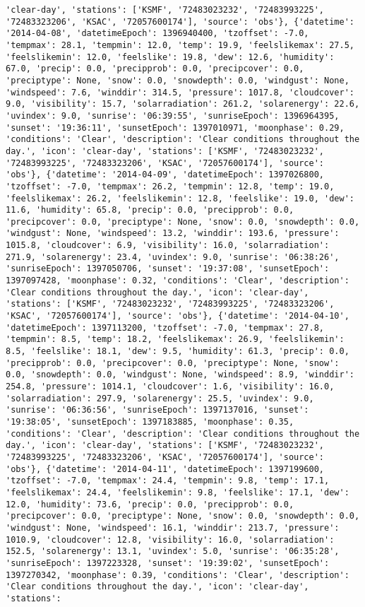 \documentclass[
  letterpaper,
  DIV=11,
  numbers=noendperiod]{scrartcl}
\begin{document}
\begin{verbatim}
'clear-day', 'stations': ['KSMF', '72483023232', '72483993225', '72483323206', 'KSAC', '72057600174'], 'source': 'obs'}, {'datetime': '2014-04-08', 'datetimeEpoch': 1396940400, 'tzoffset': -7.0, 'tempmax': 28.1, 'tempmin': 12.0, 'temp': 19.9, 'feelslikemax': 27.5, 'feelslikemin': 12.0, 'feelslike': 19.8, 'dew': 12.6, 'humidity': 67.0, 'precip': 0.0, 'precipprob': 0.0, 'precipcover': 0.0, 'preciptype': None, 'snow': 0.0, 'snowdepth': 0.0, 'windgust': None, 'windspeed': 7.6, 'winddir': 314.5, 'pressure': 1017.8, 'cloudcover': 9.0, 'visibility': 15.7, 'solarradiation': 261.2, 'solarenergy': 22.6, 'uvindex': 9.0, 'sunrise': '06:39:55', 'sunriseEpoch': 1396964395, 'sunset': '19:36:11', 'sunsetEpoch': 1397010971, 'moonphase': 0.29, 'conditions': 'Clear', 'description': 'Clear conditions throughout the day.', 'icon': 'clear-day', 'stations': ['KSMF', '72483023232', '72483993225', '72483323206', 'KSAC', '72057600174'], 'source': 'obs'}, {'datetime': '2014-04-09', 'datetimeEpoch': 1397026800, 'tzoffset': -7.0, 'tempmax': 26.2, 'tempmin': 12.8, 'temp': 19.0, 'feelslikemax': 26.2, 'feelslikemin': 12.8, 'feelslike': 19.0, 'dew': 11.6, 'humidity': 65.8, 'precip': 0.0, 'precipprob': 0.0, 'precipcover': 0.0, 'preciptype': None, 'snow': 0.0, 'snowdepth': 0.0, 'windgust': None, 'windspeed': 13.2, 'winddir': 193.6, 'pressure': 1015.8, 'cloudcover': 6.9, 'visibility': 16.0, 'solarradiation': 271.9, 'solarenergy': 23.4, 'uvindex': 9.0, 'sunrise': '06:38:26', 'sunriseEpoch': 1397050706, 'sunset': '19:37:08', 'sunsetEpoch': 1397097428, 'moonphase': 0.32, 'conditions': 'Clear', 'description': 'Clear conditions throughout the day.', 'icon': 'clear-day', 'stations': ['KSMF', '72483023232', '72483993225', '72483323206', 'KSAC', '72057600174'], 'source': 'obs'}, {'datetime': '2014-04-10', 'datetimeEpoch': 1397113200, 'tzoffset': -7.0, 'tempmax': 27.8, 'tempmin': 8.5, 'temp': 18.2, 'feelslikemax': 26.9, 'feelslikemin': 8.5, 'feelslike': 18.1, 'dew': 9.5, 'humidity': 61.3, 'precip': 0.0, 'precipprob': 0.0, 'precipcover': 0.0, 'preciptype': None, 'snow': 0.0, 'snowdepth': 0.0, 'windgust': None, 'windspeed': 8.9, 'winddir': 254.8, 'pressure': 1014.1, 'cloudcover': 1.6, 'visibility': 16.0, 'solarradiation': 297.9, 'solarenergy': 25.5, 'uvindex': 9.0, 'sunrise': '06:36:56', 'sunriseEpoch': 1397137016, 'sunset': '19:38:05', 'sunsetEpoch': 1397183885, 'moonphase': 0.35, 'conditions': 'Clear', 'description': 'Clear conditions throughout the day.', 'icon': 'clear-day', 'stations': ['KSMF', '72483023232', '72483993225', '72483323206', 'KSAC', '72057600174'], 'source': 'obs'}, {'datetime': '2014-04-11', 'datetimeEpoch': 1397199600, 'tzoffset': -7.0, 'tempmax': 24.4, 'tempmin': 9.8, 'temp': 17.1, 'feelslikemax': 24.4, 'feelslikemin': 9.8, 'feelslike': 17.1, 'dew': 12.0, 'humidity': 73.6, 'precip': 0.0, 'precipprob': 0.0, 'precipcover': 0.0, 'preciptype': None, 'snow': 0.0, 'snowdepth': 0.0, 'windgust': None, 'windspeed': 16.1, 'winddir': 213.7, 'pressure': 1010.9, 'cloudcover': 12.8, 'visibility': 16.0, 'solarradiation': 152.5, 'solarenergy': 13.1, 'uvindex': 5.0, 'sunrise': '06:35:28', 'sunriseEpoch': 1397223328, 'sunset': '19:39:02', 'sunsetEpoch': 1397270342, 'moonphase': 0.39, 'conditions': 'Clear', 'description': 'Clear conditions throughout the day.', 'icon': 'clear-day', 'stations': 
\end{verbatim}
\end{document}

